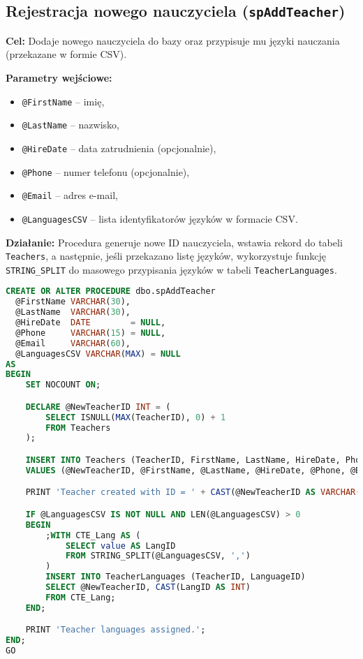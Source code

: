 \documentclass[12pt]{article}
\begin{document}
\newpage
\subsection{Rejestracja nowego nauczyciela (\texttt{spAddTeacher})}
\textbf{Cel:} Dodaje nowego nauczyciela do bazy oraz przypisuje mu języki nauczania (przekazane w formie CSV).

\textbf{Parametry wejściowe:}
\begin{itemize}
  \item \verb|@FirstName| – imię,
  \item \verb|@LastName| – nazwisko,
  \item \verb|@HireDate| – data zatrudnienia (opcjonalnie),
  \item \verb|@Phone| – numer telefonu (opcjonalnie),
  \item \verb|@Email| – adres e-mail,
  \item \verb|@LanguagesCSV| – lista identyfikatorów języków w formacie CSV.
\end{itemize}

\textbf{Działanie:} Procedura generuje nowe ID nauczyciela, wstawia rekord do tabeli \verb|Teachers|, a następnie, jeśli przekazano listę języków, wykorzystuje funkcję \verb|STRING_SPLIT| do masowego przypisania języków w tabeli \verb|TeacherLanguages|.

\begin{lstlisting}[language=SQL]
CREATE OR ALTER PROCEDURE dbo.spAddTeacher
  @FirstName VARCHAR(30),
  @LastName  VARCHAR(30),
  @HireDate  DATE        = NULL,
  @Phone     VARCHAR(15) = NULL,
  @Email     VARCHAR(60),
  @LanguagesCSV VARCHAR(MAX) = NULL
AS
BEGIN
    SET NOCOUNT ON;

    DECLARE @NewTeacherID INT = (
        SELECT ISNULL(MAX(TeacherID), 0) + 1
        FROM Teachers
    );

    INSERT INTO Teachers (TeacherID, FirstName, LastName, HireDate, Phone, Email)
    VALUES (@NewTeacherID, @FirstName, @LastName, @HireDate, @Phone, @Email);

    PRINT 'Teacher created with ID = ' + CAST(@NewTeacherID AS VARCHAR(10));

    IF @LanguagesCSV IS NOT NULL AND LEN(@LanguagesCSV) > 0
    BEGIN
        ;WITH CTE_Lang AS (
            SELECT value AS LangID
            FROM STRING_SPLIT(@LanguagesCSV, ',')
        )
        INSERT INTO TeacherLanguages (TeacherID, LanguageID)
        SELECT @NewTeacherID, CAST(LangID AS INT)
        FROM CTE_Lang;
    END;

    PRINT 'Teacher languages assigned.';
END;
GO
\end{lstlisting}
\end{document}
